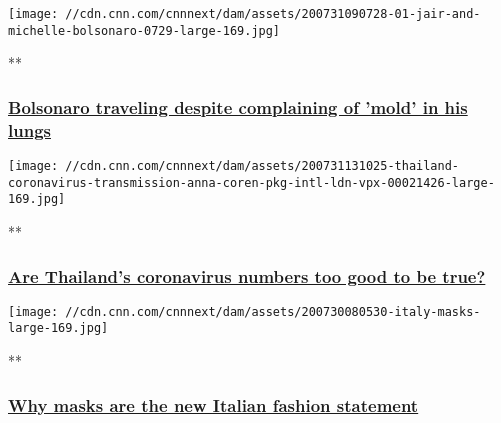 \href{/videos/world/2020/07/31/brazil-jair-michelle-bolsonaro-traveling-coronavirus-infection-lungs-npw-tsr-intl-vpx.cnn/video/playlists/coronavirus-intl/}{}

\texttt{[image: //cdn.cnn.com/cnnnext/dam/assets/200731090728-01-jair-and-michelle-bolsonaro-0729-large-169.jpg]}

**

\hypertarget{bolsonaro-traveling-despite-complaining-of-mold-in-his-lungs}{%
\subsubsection{\texorpdfstring{\href{/videos/world/2020/07/31/brazil-jair-michelle-bolsonaro-traveling-coronavirus-infection-lungs-npw-tsr-intl-vpx.cnn/video/playlists/coronavirus-intl/}{Bolsonaro
traveling despite complaining of 'mold' in his
lungs}}{Bolsonaro traveling despite complaining of 'mold' in his lungs}}\label{bolsonaro-traveling-despite-complaining-of-mold-in-his-lungs}}

\href{/videos/world/2020/07/31/thailand-coronavirus-transmission-anna-coren-pkg-intl-ldn-vpx.cnn/video/playlists/coronavirus-intl/}{}

\texttt{[image: //cdn.cnn.com/cnnnext/dam/assets/200731131025-thailand-coronavirus-transmission-anna-coren-pkg-intl-ldn-vpx-00021426-large-169.jpg]}

**

\hypertarget{are-thailands-coronavirus-numbers-too-good-to-be-true-}{%
\subsubsection{\texorpdfstring{\href{/videos/world/2020/07/31/thailand-coronavirus-transmission-anna-coren-pkg-intl-ldn-vpx.cnn/video/playlists/coronavirus-intl/}{Are
Thailand's coronavirus numbers too good to be true?
}}{Are Thailand's coronavirus numbers too good to be true? }}\label{are-thailands-coronavirus-numbers-too-good-to-be-true-}}

\href{/videos/world/2020/07/30/italy-mask-wearing-pandemic-nadeau-pkg-vpx.cnn/video/playlists/coronavirus-intl/}{}

\texttt{[image: //cdn.cnn.com/cnnnext/dam/assets/200730080530-italy-masks-large-169.jpg]}

**

\hypertarget{why-masks-are-the-new-italian-fashion-statement}{%
\subsubsection{\texorpdfstring{\href{/videos/world/2020/07/30/italy-mask-wearing-pandemic-nadeau-pkg-vpx.cnn/video/playlists/coronavirus-intl/}{Why
masks are the new Italian fashion
statement}}{Why masks are the new Italian fashion statement}}\label{why-masks-are-the-new-italian-fashion-statement}}

